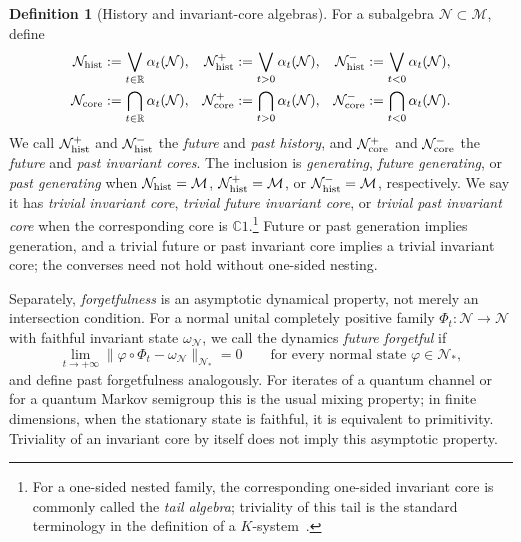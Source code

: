 \documentclass[a4paper,11pt]{article}
\theoremstyle{definition}
\newtheorem{definition}{Definition}[section]
\newcommand{\nn}{\nonumber}
\newcommand{\mN}{\mathcal{N}}
\newcommand{\mM}{\mathcal{M}}
\begin{document}
\begin{definition}[History and invariant-core algebras]\label{def:history-memory}
For a subalgebra $\mN\subset\mM$, define
\begin{align}
 \mN_{\rm hist}&:=\bigvee_{t\in\mathbb R}\alpha_t(\mN), &
 \mN_{\rm hist}^{+}&:=\bigvee_{t>0}\alpha_t(\mN), &
 \mN_{\rm hist}^{-}&:=\bigvee_{t<0}\alpha_t(\mN),\nn\\
 \mN_{\rm core}&:=\bigcap_{t\in\mathbb R}\alpha_t(\mN), &
 \mN_{\rm core}^{+}&:=\bigcap_{t>0}\alpha_t(\mN), &
 \mN_{\rm core}^{-}&:=\bigcap_{t<0}\alpha_t(\mN).
\end{align}
We call $\mN_{\rm hist}^{+}$ and $\mN_{\rm hist}^{-}$ the \emph{future} and \emph{past history}, and $\mN_{\rm core}^{+}$ and $\mN_{\rm core}^{-}$ the \emph{future} and \emph{past invariant cores}. The inclusion is \emph{generating}, \emph{future generating}, or \emph{past generating} when $\mN_{\rm hist}=\mM$, $\mN_{\rm hist}^{+}=\mM$, or $\mN_{\rm hist}^{-}=\mM$, respectively. We say it has \emph{trivial invariant core}, \emph{trivial future invariant core}, or \emph{trivial past invariant core} when the corresponding core is $\mathbb C1$.\footnote{For a one-sided nested family, the corresponding one-sided invariant core is commonly called the \emph{tail algebra}; triviality of this tail is the standard terminology in the definition of a $K$-system~\cite{CornfeldFominSinai1982,ouseph2024local}.} Future or past generation implies generation, and a trivial future or past invariant core implies a trivial invariant core; the converses need not hold without one-sided nesting.

Separately, \emph{forgetfulness} is an asymptotic dynamical property, not merely an intersection condition. For a normal unital completely positive family $\Phi_t:\mN\to\mN$ with faithful invariant state $\omega_{\mN}$, we call the dynamics \emph{future forgetful} if
\begin{equation}
 \lim_{t\to+\infty}\|\varphi\circ\Phi_t-\omega_{\mN}\|_{\mN_*}=0
 \qquad\text{for every normal state }\varphi\in\mN_* ,
 \label{eq:forgetful-dynamics}
\end{equation}
and define past forgetfulness analogously. For iterates of a quantum channel or for a quantum Markov semigroup this is the usual mixing property; in finite dimensions, when the stationary state is faithful, it is equivalent to primitivity. Triviality of an invariant core by itself does not imply this asymptotic property.
\end{definition}
\end{document}
